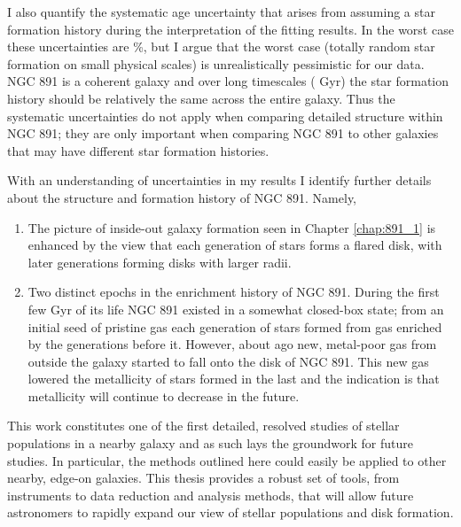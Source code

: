 I also quantify the systematic age uncertainty that arises from
assuming a star formation history during the interpretation of the
fitting results. In the worst case these uncertainties are \%,
but I argue that the worst case (totally random star formation on
small physical scales) is unrealistically pessimistic for our
data. NGC 891 is a coherent galaxy and over long timescales (
Gyr) the star formation history should be relatively the same across
the entire galaxy. Thus the systematic uncertainties do not apply when
comparing detailed structure within NGC 891; they are only important
when comparing NGC 891 to other galaxies that may have different star
formation histories.

With an understanding of uncertainties in my results I identify
further details about the structure and formation history of NGC
891. Namely,
\begin{enumerate}

\item The picture of inside-out galaxy formation seen in Chapter
  \ref{chap:891_1} is enhanced by the view that each generation of
  stars forms a flared disk, with later generations forming disks with
  larger radii.

\item Two distinct epochs in the enrichment history of NGC 891. During
  the first few Gyr of its life NGC 891 existed in a somewhat
  closed-box state; from an initial seed of pristine gas each
  generation of stars formed from gas enriched by the generations
  before it. However, about  ago new, metal-poor gas
  from outside the galaxy started to fall onto the disk of NGC
  891. This new gas lowered the metallicity of stars formed in the last
   and the indication is that metallicity will continue
  to decrease in the future.

\end{enumerate}

This work constitutes one of the first detailed, resolved studies of
stellar populations in a nearby galaxy and as such lays the groundwork
for future studies. In particular, the methods outlined here could
easily be applied to other nearby, edge-on galaxies. This thesis
provides a robust set of tools, from instruments to data reduction and
analysis methods, that will allow future astronomers to rapidly expand
our view of stellar populations and disk formation.

\clearpage
{} %
